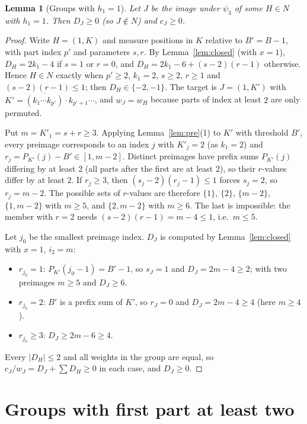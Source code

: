 \documentclass[11pt]{article}
\newtheorem{lemma}{Lemma}
\theoremstyle{remark}
\theoremstyle{definition}
\newcommand{\rev}{\overline}
\begin{document}
\begin{lemma}[Groups with $h_1=1$]\label{lem:one}
Let $J$ be the image under $\psi_3$ of some $H\in N$ with $h_1=1$. Then $D_J\ge0$ (so $J\notin N$) and $c_J\ge0$.
\end{lemma}
\begin{proof}
Write $H=(1,K)$ and measure positions in $K$ relative to $B'=B-1$, with part index $p'$ and parameters $s,r$. By Lemma~\ref{lem:closed} (with $x=1$), $D_H=2k_1-4$ if $s=1$ or $r=0$, and $D_H=2k_1-6+(s-2)(r-1)$ otherwise. Hence $H\in N$ exactly when $p'\ge2$, $k_1=2$, $s\ge2$, $r\ge1$ and $(s-2)(r-1)\le1$; then $D_H\in\{-2,-1\}$. The target is $J=(1,K')$ with $K'=\rev{(k_1\cdots k_{p'})}\cdot k_{p'+1}\cdots$, and $w_J=w_H$ because parts of index at least $2$ are only permuted.

Put $m=K'_1=s+r\ge3$. Applying Lemma~\ref{lem:pre}(1) to $K'$ with threshold $B'$, every preimage corresponds to an index $j$ with $K'_j=2$ (as $k_1=2$) and $r_j=P_{K'}(j)-B'\in[1,m-2]$. Distinct preimages have prefix sums $P_{K'}(j)$ differing by at least $2$ (all parts after the first are at least $2$), so their $r$-values differ by at least $2$. If $r_j\ge3$, then $(s_j-2)(r_j-1)\le1$ forces $s_j=2$, so $r_j=m-2$. The possible sets of $r$-values are therefore $\{1\}$, $\{2\}$, $\{m-2\}$, $\{1,m-2\}$ with $m\ge5$, and $\{2,m-2\}$ with $m\ge6$. The last is impossible: the member with $r=2$ needs $(s-2)(r-1)=m-4\le1$, i.e.\ $m\le5$.

Let $j_0$ be the smallest preimage index. $D_J$ is computed by Lemma~\ref{lem:closed} with $x=1$, $i_2=m$:
\begin{itemize}
\item $r_{j_0}=1$: $P_{K'}(j_0-1)=B'-1$, so $s_J=1$ and $D_J=2m-4\ge2$; with two preimages $m\ge5$ and $D_J\ge6$.
\item $r_{j_0}=2$: $B'$ is a prefix sum of $K'$, so $r_J=0$ and $D_J=2m-4\ge4$ (here $m\ge4$).
\item $r_{j_0}\ge3$: $D_J\ge 2m-6\ge4$.
\end{itemize}
Every $|D_H|\le2$ and all weights in the group are equal, so $c_J/w_J=D_J+\sum D_H\ge0$ in each case, and $D_J\ge0$.
\end{proof}

\section{Groups with first part at least two}
\end{document}
